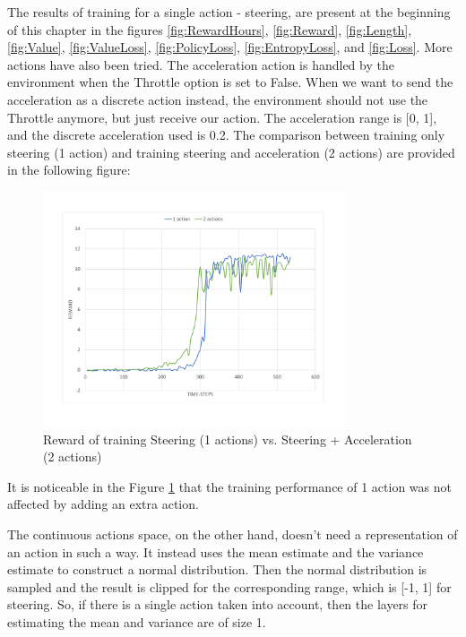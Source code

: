 The results of training for a single action - steering, are present at the beginning of this chapter in the figures \ref{fig:RewardHours}, \ref{fig:Reward}, \ref{fig:Length}, \ref{fig:Value}, \ref{fig:ValueLoss}, \ref{fig:PolicyLoss}, \ref{fig:EntropyLoss}, and \ref{fig:Loss}. More actions have also been tried. The acceleration action is handled by the environment when the Throttle option is set to False. When we want to send the acceleration as a discrete action instead, the environment should not use the Throttle anymore, but just receive our action. The acceleration range is [0, 1], and the discrete acceleration used is 0.2. The comparison between training only steering (1 action) and training steering and acceleration (2 actions) are provided in the following figure:
\begin{figure}[H]
	\centering
	\includegraphics[width=0.8\textwidth]{Figures/2Actions}
	\caption{Reward of training Steering (1 actions) vs. Steering + Acceleration (2 actions)}
	\label{fig:2Actions}
\end{figure}
It is noticeable in the Figure \ref{fig:2Actions} that the training performance of 1 action was not affected by adding an extra action.

The continuous actions space, on the other hand, doesn't need a representation of an action in such a way. It instead uses the mean estimate and the variance estimate to construct a normal distribution. Then the normal distribution is sampled and the result is clipped for the corresponding range, which is [-1, 1] for steering. So, if there is a single action taken into account, then the layers for estimating the mean and variance are of size 1.

